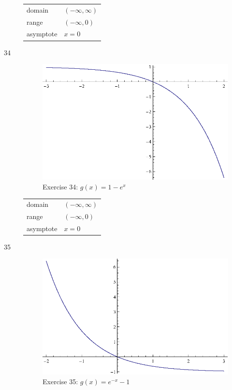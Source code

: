 \documentclass{exam}
\begin{document}
\begin{description}
        \begin{tabular}[H]{ll}
          \toprule
          domain    & $(-\infty, \infty)$ \\
          range     & $(-\infty, 0)$ \\
          asymptote & $x = 0$ \\
          \bottomrule
        \end{tabular}

      \item[34] 
        \begin{figure}[H]
          \centering
          \includegraphics[scale=1.0]{exercise34.eps}
          \caption*{Exercise 34: $g(x) = 1 - e^x$}
        \end{figure}

        \begin{tabular}[H]{ll}
          \toprule
          domain    & $(-\infty, \infty)$ \\
          range     & $(-\infty, 0)$ \\
          asymptote & $x = 0$ \\
          \bottomrule
        \end{tabular}

      \item[35] 
        \begin{figure}[H]
          \centering
          \includegraphics[scale=1.0]{exercise35.eps}
          \caption*{Exercise 35: $g(x) = e^{-x} - 1$}
        \end{figure}


\end{description}
\end{document}
